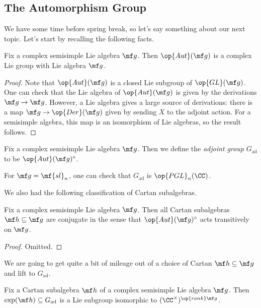 \documentclass[../notes.tex]{subfiles}
\begin{document}
\subsection{The Automorphism Group}
We have some time before spring break, so let's say something about our next topic. Let's start by recalling the following facts.
\begin{proposition}
	Fix a complex semisimple Lie algebra $\mf g$. Then $\op{Aut}(\mf g)$ is a complex Lie group with Lie algebra $\mf g$.
\end{proposition}
\begin{proof}
	Note that $\op{Aut}(\mf g)$ is a closed Lie subgroup of $\op{GL}(\mf g)$. One can check that the Lie algebra of $\op{Aut}(\mf g)$ is given by the derivations $\mf g\to\mf g$. However, a Lie algebra gives a large source of derivations: there is a map $\mf g\to\op{Der}(\mf g)$ given by sending $X$ to the adjoint action. For a semisimple algebra, this map is an isomorphism of Lie algebras, so the result follows.
\end{proof}
\begin{definition}
	Fix a complex semisimple Lie algebra $\mf g$. Then we define the \textit{adjoint group} $G_{\mathrm{ad}}$ to be $\op{Aut}(\mf g)^\circ$.
\end{definition}
\begin{example}
	For $\mf g=\mf{sl}_n$, one can check that $G_{\mathrm{ad}}$ is $\op{PGL}_n(\CC)$.
\end{example}
We also had the following classification of Cartan subalgebras.
\begin{proposition}
	Fix a complex semisimple Lie algebra $\mf g$. Then all Cartan subalgebras $\mf h\subseteq\mf g$ are conjugate in the sense that $\op{Aut}(\mf g)^\circ$ acts transitively on $\mf g$.
\end{proposition}
\begin{proof}
	Omitted.
\end{proof}
We are going to get quite a bit of mileage out of a choice of Cartan $\mf h\subseteq\mf g$ and lift to $G_{\mathrm{ad}}$.
\begin{lemma}
	Fix a Cartan subalgebra $\mf h$ of a complex semisimple Lie algebra $\mf g$. Then $\exp(\mf h)\subseteq G_{\mathrm{ad}}$ is a Lie subgroup isomorphic to $(\CC^\times)^{\op{rank}\mf g}$.
\end{lemma}
\end{document}
